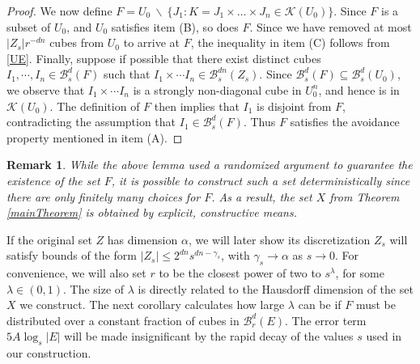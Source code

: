 \documentclass[usenames,dvipsnames,letterpaper, reqno,11pt]{article}
\theoremstyle{plain}
\theoremstyle{plain}
\newtheorem*{remark}{Remark}
\begin{document}
\begin{proof}
	We now define $F = U_0\ \backslash\ \{ J_1 : K = J_1 \times \dots \times J_n \in \mathcal{K}(U_0) \}$. Since $F$ is a subset of $U_0$, and $U_0$ satisfies item (B), so does $F$. Since we have removed at most $|Z_s| r^{-dn}$ cubes from $U_0$ to arrive at $F$,  the inequality in item (C) follows from \eqref{UE}. Finally, suppose if possible that there exist distinct cubes $I_1, \cdots, I_n \in \mathcal B_s^{d}(F)$ such that $I_1 \times \cdots I_n \in \mathcal B_s^{dn}(Z_s)$. Since $\mathcal B_s^{d}(F) \subseteq \mathcal B_s^{d}(U_0)$, we observe that $I_1 \times \cdots I_n$ is a strongly non-diagonal cube in $U_0^n$, and hence is in $\mathcal K(U_0)$. The definition of $F$ then implies that $I_1$ is disjoint from $F$, contradicting the assumption that $I_1 \in \mathcal B_s^{d}(F)$. 
Thus $F$ satisfies the avoidance property mentioned in item (A).
\end{proof}

\begin{remark}
	While the above lemma used a randomized argument to guarantee the existence of the set $F$, it is possible to construct such a set deterministically since there are only finitely many choices for $F$. As a result, the set $X$ from Theorem \ref{mainTheorem} is obtained by explicit, constructive means.
\end{remark}

If the original set $Z$ has dimension $\alpha$, we will later show its discretization $Z_s$ will satisfy bounds of the form $|Z_s| \leq 2^{dn} s^{dn-\gamma_s}$, with $\gamma_s\to\alpha$ as $s \to 0$. For convenience, we will also set $r$ to be the closest power of two to $s^\lambda$, for some $\lambda \in (0,1)$. The size of $\lambda$ is directly related to the Hausdorff dimension of the set $X$ we construct. The next corollary calculates how large $\lambda$ can be if $F$ must be distributed over a constant fraction of cubes in $\mathcal{B}^d_r(E)$. The error term $5A \log_s |E|$ will be made insignificant by the rapid decay of the values $s$ used in our construction.
\end{document}
